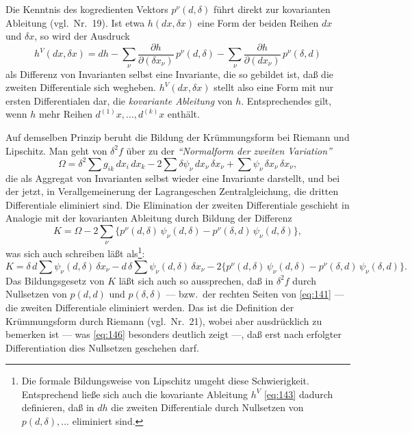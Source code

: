 \documentclass[fontsize=10pt,paper=a5,pagesize,headings=small]{scrbook}
\theoremstyle{plain}
\begin{document}
\newpage
\setcounter{page}{420}

Die Kenntnis des kogredienten Vektors $p^\nu(d,\delta)$ führt direkt zur
kovarianten Ableitung (vgl.\ Nr.~19). Ist etwa $h(dx,\delta x)$ eine Form der
beiden Reihen $dx$ und $\delta x$, so wird der Ausdruck
\begin{equation}
\label{eq:143}
h^V(dx,\delta x) = dh - \sum_\nu \frac{\partial h}{\partial(\delta x_\nu)}\,p^\nu(d,\delta)
- \sum_\nu \frac{\partial h}{\partial(dx_\nu)}\,p^\nu(\delta,d)
\end{equation}
als Differenz von Invarianten selbst eine Invariante, die so gebildet ist,
daß die zweiten Differentiale sich wegheben. $h^V(dx,\delta x)$ stellt also eine Form
mit nur ersten Differentialen dar, die \textit{kovariante Ableitung} von $h$.
Entsprechendes gilt, wenn $h$ mehr Reihen $d^{(1)}x,\dots,d^{(k)}x$ enthält.

Auf demselben Prinzip beruht die Bildung der Krümmungsform bei Riemann
und Lipschitz. Man geht von $\delta^2 f$ über zu der \textit{``Normalform der zweiten
Variation''}
\begin{equation}
\label{eq:144}
\Omega = \delta^2 \sum g_{ik}\,dx_i\,dx_k - 2\sum \delta\psi_\nu\,dx_\nu\,\delta x_\nu + \sum \psi_\nu\,\delta x_\nu\,\delta x_\nu,
\end{equation}
die als Aggregat von Invarianten selbst wieder eine Invariante darstellt,
und bei der jetzt, in Verallgemeinerung der Lagrangeschen Zentralgleichung,
die dritten Differentiale eliminiert sind. Die Elimination der zweiten
Differentiale geschieht in Analogie mit der kovarianten Ableitung durch
Bildung der Differenz
\begin{equation}
\label{eq:145}
K = \Omega - 2\sum_\nu \{p^\nu(d,\delta)\,\psi_\nu(d,\delta) - p^\nu(\delta,d)\,\psi_\nu(d,\delta)\},
\end{equation}
was sich auch schreiben läßt als\footnote{Die formale Bildungsweise von Lipschitz
umgeht diese Schwierigkeit. Entsprechend ließe sich auch die kovariante Ableitung
$h^V$ \eqref{eq:143} dadurch definieren, daß in $dh$ die zweiten Differentiale durch
Nullsetzen von $p(d,\delta),\dots$ eliminiert sind.}:
\begin{equation}
\label{eq:146}
K = \delta\,d\sum \psi_\nu(d,\delta)\,\delta x_\nu - d\,\delta\sum \psi_\nu(d,\delta)\,\delta x_\nu
- 2\{p^\nu(d,\delta)\,\psi_\nu(d,\delta) - p^\nu(\delta,d)\,\psi_\nu(\delta,d)\}.
\end{equation}
Das Bildungsgesetz von $K$ läßt sich auch so aussprechen, daß in
$\delta^2 f$ durch Nullsetzen von $p(d,d)$ und $p(\delta,\delta)$ --- bzw.~der rechten Seiten
von \eqref{eq:141} --- die zweiten Differentiale eliminiert werden. Das ist die
Definition der Krümmungsform durch Riemann (vgl.\ Nr.~21), wobei aber
ausdrücklich zu bemerken ist --- was \eqref{eq:146} besonders deutlich zeigt ---,
daß erst nach erfolgter Differentiation dies Nullsetzen geschehen darf.
\end{document}
